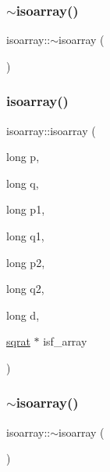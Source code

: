 \subsubsection{\texorpdfstring{$\sim$isoarray()}{~isoarray()}\hspace{0.1cm}{\footnotesize\ttfamily [1/2]}}
{\footnotesize\ttfamily isoarray\+::$\sim$isoarray (\begin{DoxyParamCaption}{ }\end{DoxyParamCaption})}

\mbox{\label{classisoarray_a2255ec3a14431cdc95ea8d0b0150fde6}} 
\subsubsection{\texorpdfstring{isoarray()}{isoarray()}\hspace{0.1cm}{\footnotesize\ttfamily [2/2]}}
{\footnotesize\ttfamily isoarray\+::isoarray (\begin{DoxyParamCaption}\item[{long}]{p,  }\item[{long}]{q,  }\item[{long}]{p1,  }\item[{long}]{q1,  }\item[{long}]{p2,  }\item[{long}]{q2,  }\item[{long}]{d,  }\item[{\mbox{\hyperlink{classsqrat}{sqrat}} $\ast$}]{isf\+\_\+array }\end{DoxyParamCaption})}

\mbox{\label{classisoarray_ab1ff7ca3e0edb468608b42d2d2aad08b}} 
\subsubsection{\texorpdfstring{$\sim$isoarray()}{~isoarray()}\hspace{0.1cm}{\footnotesize\ttfamily [2/2]}}
{\footnotesize\ttfamily isoarray\+::$\sim$isoarray (\begin{DoxyParamCaption}{ }\end{DoxyParamCaption})}



